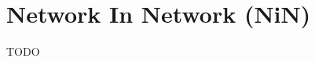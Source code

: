 \section{Network In Network (NiN) \cite{arxiv/1312.4400-nin,medium/towardsdatascience.com/review-nin-network-in-network-image-classification-69e271e499ee}}\label{Network In Network (NiN)}

TODO













































































































































